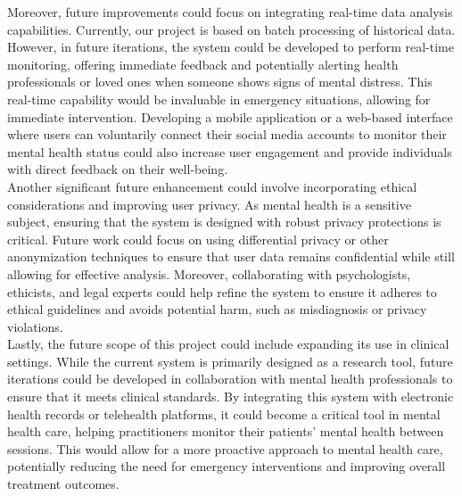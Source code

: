 \noindent
Moreover, future improvements could focus on integrating real-time data analysis capabilities. Currently, our project is based on batch processing of historical data. However, in future iterations, the system could be developed to perform real-time monitoring, offering immediate feedback and potentially alerting health professionals or loved ones when someone shows signs of mental distress. This real-time capability would be invaluable in emergency situations, allowing for immediate intervention. Developing a mobile application or a web-based interface where users can voluntarily connect their social media accounts to monitor their mental health status could also increase user engagement and provide individuals with direct feedback on their well-being. \\

\noindent
Another significant future enhancement could involve incorporating ethical considerations and improving user privacy. As mental health is a sensitive subject, ensuring that the system is designed with robust privacy protections is critical. Future work could focus on using differential privacy or other anonymization techniques to ensure that user data remains confidential while still allowing for effective analysis. Moreover, collaborating with psychologists, ethicists, and legal experts could help refine the system to ensure it adheres to ethical guidelines and avoids potential harm, such as misdiagnosis or privacy violations. \\

\noindent
Lastly, the future scope of this project could include expanding its use in clinical settings. While the current system is primarily designed as a research tool, future iterations could be developed in collaboration with mental health professionals to ensure that it meets clinical standards. By integrating this system with electronic health records or telehealth platforms, it could become a critical tool in mental health care, helping practitioners monitor their patients’ mental health between sessions. This would allow for a more proactive approach to mental health care, potentially reducing the need for emergency interventions and improving overall treatment outcomes.

